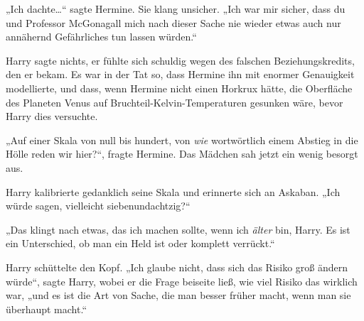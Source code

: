 „Ich dachte…“ sagte Hermine. Sie klang unsicher. „Ich war mir sicher, dass du und Professor McGonagall mich nach dieser Sache nie wieder etwas auch nur annähernd Gefährliches tun lassen würden.“

Harry sagte nichts, er fühlte sich schuldig wegen des falschen Beziehungskredits, den er bekam. Es war in der Tat so, dass Hermine ihn mit enormer Genauigkeit modellierte, und dass, wenn Hermine nicht einen Horkrux hätte, die Oberfläche des Planeten Venus auf Bruchteil-Kelvin-Temperaturen gesunken wäre, bevor Harry dies versuchte.

„Auf einer Skala von null bis hundert, von \emph{wie} wortwörtlich einem Abstieg in die Hölle reden wir hier?“, fragte Hermine. Das Mädchen sah jetzt ein wenig besorgt aus.

Harry kalibrierte gedanklich seine Skala und erinnerte sich an Askaban.
„Ich würde sagen, vielleicht siebenundachtzig?“

„Das klingt nach etwas, das ich machen sollte, wenn ich \emph{älter} bin, Harry. Es ist ein Unterschied, ob man ein Held ist oder komplett verrückt.“

Harry schüttelte den Kopf. „Ich glaube nicht, dass sich das Risiko groß ändern würde“, sagte Harry, wobei er die Frage beiseite ließ, wie viel Risiko das wirklich war, „und es ist die Art von Sache, die man besser früher macht, wenn man sie überhaupt macht.“


